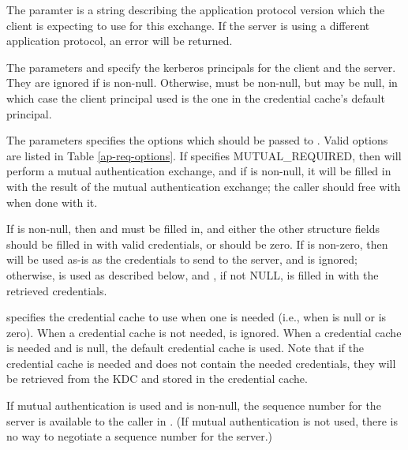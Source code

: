 The paramter  is a string describing the
application protocol version which the client is expecting to use for
this exchange.  If the server is using a different application protocol,
an error will be returned.

The parameters  and  specify the
kerberos principals for the client and the server.  They are
ignored if  is non-null.  Otherwise,
 must be non-null, but  may be
null, in which case the client principal used is the one in the
credential cache's default principal.

The  parameters specifies the options which
should be passed to .  Valid options are listed
in Table \ref{ap-req-options}.  If 
specifies MUTUAL_REQUIRED, then  will perform
a mutual authentication exchange, and if  is
non-null, it will be filled in with the result of the mutual
authentication exchange; the caller should free
 with
 when done with it.

If  is non-null, then
 and 
 must be filled in, and either
the other structure fields should be filled in with valid credentials,
or  should be zero.  If
 is non-zero, then
 will be used as-is as the credentials to send to
the server, and  is ignored; otherwise,
 is used as described below, and 
, if not NULL, is filled in with the retrieved credentials.

 specifies the credential cache to use when one is
needed (i.e., when  is null or
 is zero).  When a credential
cache is not needed,  is ignored.  When a credential
cache is needed and  is null, the default credential
cache is used.  Note that if the credential cache is needed and does
not contain the needed credentials, they will be retrieved from the
KDC and stored in the credential cache.

If mutual authentication is used and  is non-null,
the sequence number for the server is available to the caller in
.  (If mutual authentication is not
used, there is no way to negotiate a sequence number for the server.)

